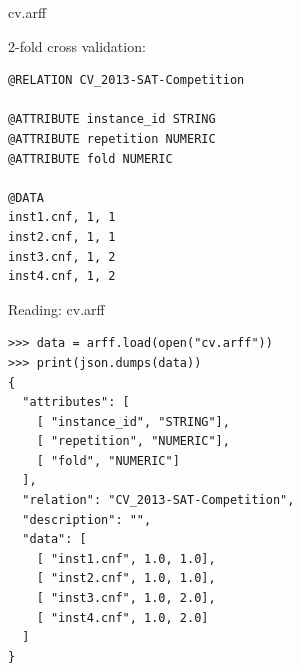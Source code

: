 \documentclass[t]{beamer}
\begin{document}
\begin{frame}[c, fragile]{cv.arff}

2-fold cross validation:

\small
\begin{verbatim}
@RELATION CV_2013-SAT-Competition

@ATTRIBUTE instance_id STRING
@ATTRIBUTE repetition NUMERIC
@ATTRIBUTE fold NUMERIC

@DATA
inst1.cnf, 1, 1
inst2.cnf, 1, 1
inst3.cnf, 1, 2
inst4.cnf, 1, 2
\end{verbatim}


\end{frame}
\begin{frame}[c,fragile]{Reading: cv.arff}

\scriptsize
\begin{verbatim}
>>> data = arff.load(open("cv.arff"))
>>> print(json.dumps(data))
{
  "attributes": [
    [ "instance_id", "STRING"], 
    [ "repetition", "NUMERIC"], 
    [ "fold", "NUMERIC"]
  ], 
  "relation": "CV_2013-SAT-Competition", 
  "description": "", 
  "data": [
    [ "inst1.cnf", 1.0, 1.0], 
    [ "inst2.cnf", 1.0, 1.0], 
    [ "inst3.cnf", 1.0, 2.0], 
    [ "inst4.cnf", 1.0, 2.0]
  ]
}


\end{verbatim}

\end{frame}
\end{document}
